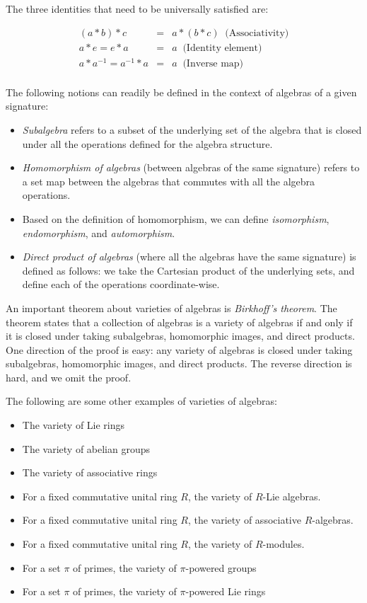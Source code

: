 \documentclass{ucetd}
\begin{document}
The three identities that need to be universally satisfied are:

\begin{eqnarray*}
  (a * b) * c & = & a * (b * c) \ \text{ (Associativity)}\\
  a * e = e * a & = &  a \ \text{ (Identity element)}\\
  a * a^{-1} = a^{-1} * a & = & a \ \text{ (Inverse map)}\\
\end{eqnarray*}

The following notions can readily be defined in the context of
algebras of a given signature:

\begin{itemize}
\item {\em Subalgebra} refers to a subset of the underlying set of the
  algebra that is closed under all the operations defined for the
  algebra structure.
\item {\em Homomorphism of algebras} (between algebras of the same
  signature) refers to a set map between the algebras that commutes
  with all the algebra operations.
\item Based on the definition of homomorphism, we can define {\em
  isomorphism}, {\em endomorphism}, and {\em automorphism}.
\item {\em Direct product of algebras} (where all the algebras have
  the same signature) is defined as follows: we take the Cartesian
  product of the underlying sets, and define each of the operations
  coordinate-wise.
\end{itemize}

An important theorem about varieties of algebras is {\em Birkhoff's
  theorem}. The theorem states that a collection of algebras is a
variety of algebras if and only if it is closed under taking
subalgebras, homomorphic images, and direct products. One direction of
the proof is easy: any variety of algebras is closed under taking
subalgebras, homomorphic images, and direct products. The reverse
direction is hard, and we omit the proof.

The following are some other examples of varieties of algebras:

\begin{itemize}
\item The variety of Lie rings
\item The variety of abelian groups
\item The variety of associative rings
\item For a fixed commutative unital ring $R$, the variety of $R$-Lie algebras.
\item For a fixed commutative unital ring $R$, the variety of
  associative $R$-algebras.
\item For a fixed commutative unital ring $R$, the variety of
  $R$-modules.
\item For a set $\pi$ of primes, the variety of $\pi$-powered groups
\item For a set $\pi$ of primes, the variety of $\pi$-powered Lie rings
\end{itemize}
\end{document}
